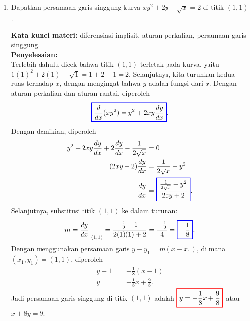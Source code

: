\documentclass[10pt,openany,a4paper]{article}
\theoremstyle{definition}
\theoremstyle{definition}
\theoremstyle{plain}
\newenvironment{jawab}[2][tes]{%
\par\noindent\textbf{Kata kunci materi:} #1.\\
\textbf{Penyelesaian:} #2%
}{}
\begin{document}
\begin{enumerate}
    \item Dapatkan persamaan garis singgung kurva $xy^2+2y-\sqrt{x}=2$ di titik $(1,1)$.
    \begin{jawab}[diferensiasi implisit, aturan perkalian, persamaan garis singgung]{~\\
        Terlebih dahulu dicek bahwa titik $(1,1)$ terletak pada kurva, yaitu $1(1)^2+2(1)-\sqrt{1}=1+2-1=2$. Selanjutnya, kita turunkan kedua ruas terhadap $x$, dengan mengingat bahwa $y$ adalah fungsi dari $x$. Dengan aturan perkalian dan aturan rantai, diperoleh
        \begin{align*}
            \colorlet{oldcolor}{.}
        \color{blue}
        \setlength{\fboxrule}{1pt} \boxed{\color{oldcolor}\frac{d}{dx}(xy^2) = y^2 + 2xy\frac{dy}{dx}}\color{oldcolor}.
        \end{align*}
        Dengan demikian, diperoleh
        \begin{align*}
            y^2 + 2xy\frac{dy}{dx} + 2\frac{dy}{dx} - \frac{1}{2\sqrt{x}} &= 0\\
            (2xy + 2)\frac{dy}{dx} &= \frac{1}{2\sqrt{x}} - y^2\\
            \frac{dy}{dx} &= \colorlet{oldcolor}{.}
        \color{blue}
        \setlength{\fboxrule}{1pt} \boxed{\color{oldcolor}\frac{\frac{1}{2\sqrt{x}} - y^2}{2xy + 2}}\color{oldcolor}.
        \end{align*}
        Selanjutnya, substitusi titik $(1,1)$ ke dalam turunan:
        \begin{align*}
            m = \frac{dy}{dx}\bigg|_{(1,1)} = \frac{\frac{1}{2} - 1}{2(1)(1) + 2} = \frac{-\frac{1}{2}}{4} = \colorlet{oldcolor}{.}
        \color{blue}
        \setlength{\fboxrule}{1pt} \boxed{\color{oldcolor}-\frac{1}{8}}\color{oldcolor}.
        \end{align*}
        Dengan menggunakan persamaan garis $y - y_1 = m(x - x_1)$, di mana $(x_1,y_1)=(1,1)$, diperoleh
        \begin{align*}
            y - 1 &= -\frac{1}{8}(x - 1)\\
            y &= -\frac{1}{8}x + \frac{9}{8}.
        \end{align*}
        Jadi persamaan garis singgung di titik $(1,1)$ adalah $\colorlet{oldcolor}{.}
        \color{red}
        \setlength{\fboxrule}{1pt} \boxed{\color{oldcolor}y = -\frac{1}{8}x + \frac{9}{8}}\color{oldcolor}$ atau $x+8y=9$.
    }
    \end{jawab}
\end{enumerate}
\end{document}
